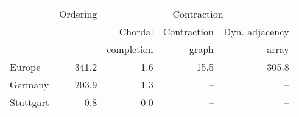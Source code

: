 \begin{tabular}{lrrrr}
\toprule
{} &  Ordering & \multicolumn{3}{c}{Contraction} \\ \cmidrule(lr){3-5}
{} &  {} &  Chordal &  Contraction & Dyn. adjacency \\
{} &  {} &  completion & graph \cite{DibbeltSW16} & array \cite{DibbeltSW16} \\
\midrule
Europe    &                        341.2 &                          1.6 &        15.5 &        305.8 \\
Germany   &                        203.9 &                          1.3 &          -- &           -- \\
Stuttgart &                          0.8 &                          0.0 &          -- &           -- \\
\bottomrule
\end{tabular}


